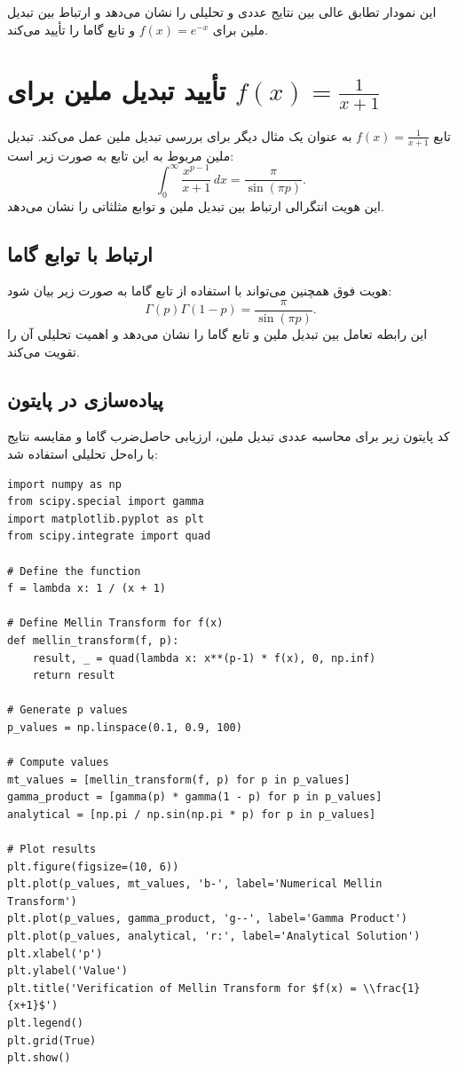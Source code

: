 \documentclass[12pt,a4paper]{article}
\begin{document}
این نمودار تطابق عالی بین نتایج عددی و تحلیلی را نشان می‌دهد و ارتباط بین تبدیل ملین برای $f(x) = e^{-x}$ و تابع گاما را تأیید می‌کند.
\section{تأیید تبدیل ملین برای $f(x) = \frac{1}{x+1}$}

تابع $f(x) = \frac{1}{x+1}$ به عنوان یک مثال دیگر برای بررسی تبدیل ملین عمل می‌کند. تبدیل ملین مربوط به این تابع به صورت زیر است:
\begin{equation}
\int_{0}^{\infty} \frac{x^{p-1}}{x+1} \, dx = \frac{\pi}{\sin(\pi p)}.
\end{equation}
این هویت انتگرالی ارتباط بین تبدیل ملین و توابع مثلثاتی را نشان می‌دهد.

\subsection{ارتباط با توابع گاما}
هویت فوق همچنین می‌تواند با استفاده از تابع گاما به صورت زیر بیان شود:
\begin{equation}
\Gamma(p) \Gamma(1-p) = \frac{\pi}{\sin(\pi p)}.
\end{equation}
این رابطه تعامل بین تبدیل ملین و تابع گاما را نشان می‌دهد و اهمیت تحلیلی آن را تقویت می‌کند.

\subsection{پیاده‌سازی در پایتون}
کد پایتون زیر برای محاسبه عددی تبدیل ملین، ارزیابی حاصل‌ضرب گاما و مقایسه نتایج با راه‌حل تحلیلی استفاده شد:
\begin{verbatim}
import numpy as np
from scipy.special import gamma
import matplotlib.pyplot as plt
from scipy.integrate import quad

# Define the function
f = lambda x: 1 / (x + 1)

# Define Mellin Transform for f(x)
def mellin_transform(f, p):
    result, _ = quad(lambda x: x**(p-1) * f(x), 0, np.inf)
    return result

# Generate p values
p_values = np.linspace(0.1, 0.9, 100)

# Compute values
mt_values = [mellin_transform(f, p) for p in p_values]
gamma_product = [gamma(p) * gamma(1 - p) for p in p_values]
analytical = [np.pi / np.sin(np.pi * p) for p in p_values]

# Plot results
plt.figure(figsize=(10, 6))
plt.plot(p_values, mt_values, 'b-', label='Numerical Mellin Transform')
plt.plot(p_values, gamma_product, 'g--', label='Gamma Product')
plt.plot(p_values, analytical, 'r:', label='Analytical Solution')
plt.xlabel('p')
plt.ylabel('Value')
plt.title('Verification of Mellin Transform for $f(x) = \\frac{1}{x+1}$')
plt.legend()
plt.grid(True)
plt.show()
\end{verbatim}
\end{document}
